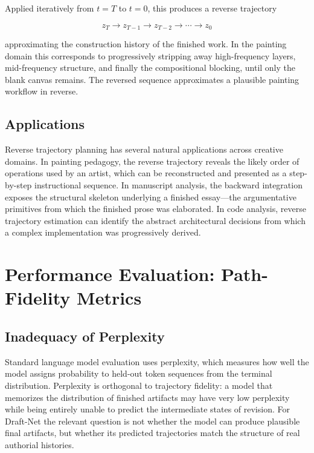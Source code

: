 \documentclass[12pt,a4paper]{article}
\theoremstyle{draftthm}
\begin{document}
Applied iteratively from $t=T$ to $t=0$, this produces a reverse trajectory

\begin{equation}
  z_T \to z_{T-1} \to z_{T-2} \to \cdots \to z_0
\end{equation}

approximating the construction history of the finished work. In the painting domain this corresponds to progressively stripping away high-frequency layers, mid-frequency structure, and finally the compositional blocking, until only the blank canvas remains. The reversed sequence approximates a plausible painting workflow in reverse.

\subsection{Applications}

Reverse trajectory planning has several natural applications across creative domains. In painting pedagogy, the reverse trajectory reveals the likely order of operations used by an artist, which can be reconstructed and presented as a step-by-step instructional sequence. In manuscript analysis, the backward integration exposes the structural skeleton underlying a finished essay---the argumentative primitives from which the finished prose was elaborated. In code analysis, reverse trajectory estimation can identify the abstract architectural decisions from which a complex implementation was progressively derived.

\section{Performance Evaluation: Path-Fidelity Metrics}

\subsection{Inadequacy of Perplexity}

Standard language model evaluation uses perplexity, which measures how well the model assigns probability to held-out token sequences from the terminal distribution. Perplexity is orthogonal to trajectory fidelity: a model that memorizes the distribution of finished artifacts may have very low perplexity while being entirely unable to predict the intermediate states of revision. For Draft-Net the relevant question is not whether the model can produce plausible final artifacts, but whether its predicted trajectories match the structure of real authorial histories.
\end{document}
